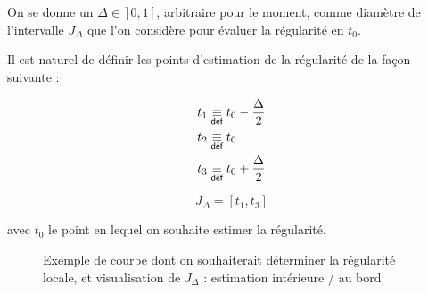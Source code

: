 \smallskip

On se donne un $\Delta \in \, ] \, 0,1 \,[ \,$, arbitraire pour le moment, comme diamètre de l'intervalle $J_\Delta$ que l'on considère pour évaluer la régularité en $t_0$.

\noindent Il est naturel de définir les points d'estimation de la régularité de la façon suivante :

\begin{minipage}{0.5\textwidth}
	\begin{align*}
		t_1 & \isdef t_0 - \frac \Delta 2 \\
		t_2 & \isdef t_0                  \\
		t_3 & \isdef t_0 + \frac \Delta 2
	\end{align*}
\end{minipage}
\hfill
\begin{minipage}{0.5\textwidth}
	\begin{equation*}
		J_\Delta = [t_1, t_3]
	\end{equation*}

	\begin{center}
		avec $t_0$ le point en lequel on souhaite estimer la régularité.
	\end{center}
\end{minipage}


\begin{figure}[H]
	\centering
	\begin{minipage}{0.45\linewidth}
		\scalebox{0.885}{
			
		}
	\end{minipage}
	\hfill
	\begin{minipage}{0.45\linewidth}
		\scalebox{0.885}{
			
		}
	\end{minipage}
	\label{fig:delta_method_example}
	\caption{Exemple de courbe dont on souhaiterait déterminer la régularité locale, et visualisation de $J_\Delta$ : estimation intérieure / au bord}
\end{figure}

